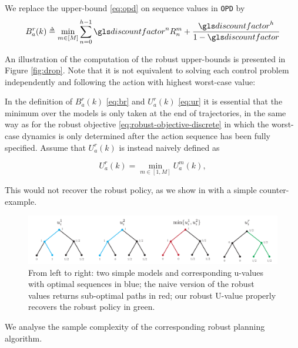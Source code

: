 \begin{definition}
	\begin{leftbar}[defnbar]
	We replace the upper-bound \eqref{eq:opd} on sequence values in \texttt{OPD} by
	\begin{equation}
	\label{eq:robust-b-values}
	B_a^r(k)  \eqdef \min_{m\in[M]} \sum_{n=0}^{h-1} \discount^n R_n^m  + \frac{\discount^h}{1-\discount}
	\end{equation}
	\end{leftbar}
\end{definition}
An illustration of the computation of the robust upper-bounds is presented in Figure \ref{fig:drop}. 
Note that it is not equivalent to solving each control problem independently and following the action with highest worst-case value:
\begin{remark}
	\label{sec:min-max-order}
	\begin{leftbar}[remarkbar]
	In the definition of $B_{a}^{r}(k)$ \eqref{eq:br} and $U_{a}^{r}(k)$ \eqref{eq:ur} it is essential that the minimum over the models is only taken at the end of trajectories, in the same way as for the robust objective \eqref{eq:robust-objective-discrete} in which the worst-case dynamics is only determined after the action sequence has been fully specified. Assume that $U_{a}^{r}(k)$ is instead naively defined as
	
	\[
	U_{a}^{r}(k)=\min_{m\in[1,M]}U_{a}^{m}(k),
	\]
	
	This would not recover the robust policy, as we show in  with a simple counter-example.
\end{leftbar}
	\begin{figure}[htp]
	\centering
	\includegraphics[width=\linewidth]{img/min-max-order}
	\caption{From left to right: two simple models and corresponding u-values with optimal sequences in blue; the naive version of the robust values returns sub-optimal paths in red; our robust U-value properly recovers the robust policy in green.}
	\label{fig:min-max-order}
	\end{figure}
\end{remark}

We analyse the sample complexity of the corresponding robust planning algorithm.

